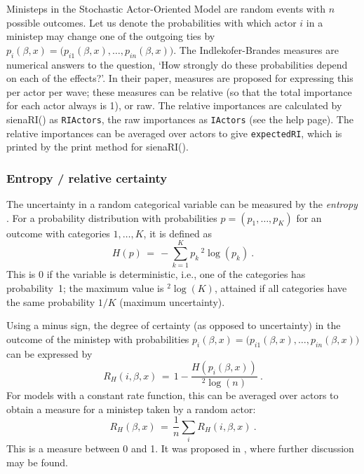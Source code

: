 \documentclass[a4paper,fleqn,11pt]{article}
\newcommand{\+}{\, + \,}
\newcommand{\sfn}[1]{\textsf{#1}}
\newcommand{\saom}{{Stochastic Actor-Oriented Model}}
\begin{document}
Ministeps in the {\saom} are random events with $n$ possible outcomes.
Let us denote the probabilities with which
actor $i$ in a ministep may change one of the outgoing ties by
$p_{i}(\beta, x) = \big(p_{i1}(\beta, x), \ldots, p_{in}(\beta, x)\big)$.
The Indlekofer-Brandes measures are numerical answers to the question,
`How strongly do these probabilities depend on each of the effects?'.
In their paper, measures are proposed for expressing this per actor
per wave; these measures can be relative (so that the total importance
for each actor always is 1), or raw.
The relative importances are calculated by  \sfn{sienaRI()} as \texttt{RIActors},
the raw importances as \texttt{IActors} (see the help page).
The  relative importances can be averaged over actors to give
\texttt{expectedRI}, which is printed by the print method for \sfn{sienaRI()}.

\subsubsection{Entropy / relative certainty}

The uncertainty in a random categorical variable
can be measured by the \emph{entropy} \citep{Shannon1948}. For a probability
distribution with probabilities $p = (p_1, \ldots, p_K)$ for
an outcome with categories $1, \ldots, K$, it is defined as
\begin{equation}\label{entropy}
  H(p) \,=\, - \sum_{k=1}^K p_k {}\,^2 \log(p_k) \ .
\end{equation}
This is 0 if the variable is deterministic, i.e., one of the categories
has probability~1; the maximum value is ${}^2 \log(K)$, attained if all
categories have the same probability $1/K$ (maximum uncertainty).

Using a minus sign, the degree of certainty (as opposed to uncertainty)
in the outcome of the ministep with probabilities
$p_{i}(\beta, x) = \big(p_{i1}(\beta, x), \ldots, p_{in}(\beta, x)\big)$
can be expressed by
\begin{equation}\label{uncertainty}
  R_H(i,\beta, x) \,=\,  1 - \frac{H(p_{i}(\beta, x))}{{}^2 \log(n)} \ .
\end{equation}
For models with a constant rate function, this can be averaged over
actors to obtain a measure for a ministep taken by a random actor:
\begin{equation}\label{explained}
  R_H(\beta, x) \,=\, \frac1n \sum_i R_H(i,\beta, x) \ .
\end{equation}
This is a measure between 0 and 1.
It was proposed in \citet{Snijders04}, where further discussion may be found.
\end{document}
